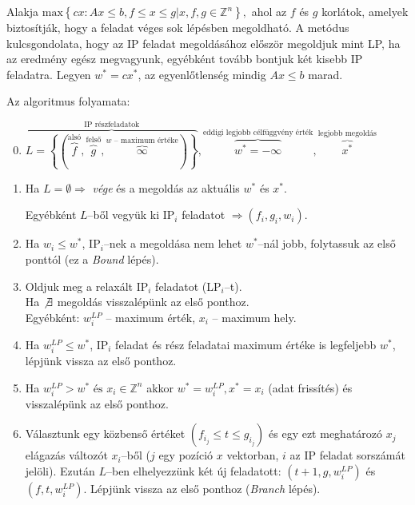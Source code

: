 Alakja $\mbox{max} \left\{cx:Ax \leq b, f \leq x \leq g| x,f,g \in \mathbb{Z}^n
	\right\},$ ahol az $f$ és $g$ korlátok, amelyek biztosítják, hogy a feladat véges sok
lépésben megoldható. A metódus kulcsgondolata, hogy az IP feladat megoldásához először
megoldjuk mint LP, ha az eredmény egész megvagyunk, egyébként tovább bontjuk két kisebb
IP feladatra. Legyen $w^*=cx^*$, az egyenlőtlenség mindig $Ax \leq b$ marad.

Az algoritmus folyamata:

\begin{enumerate}
	\setcounter{enumi}{-1}
	\item $\overbrace{L=\left\{ \left(
			      \overbrace{f}^{\text{alsó}},\overbrace{g}^{\text{felső}},\overbrace{\infty}^{w
				      \text{ -- maximum értéke}} \right) \right\}}^{\text{IP részfeladatok}},
		      \overbrace{w^*=-\infty}^{\text{eddigi legjobb célfüggvény érték}},
		      \overbrace{x^*}^{\text{legjobb megoldás}}$
	\item Ha $L=\emptyset \Rightarrow$ \emph{vége} és a megoldás az aktuális $w^*$
	      és $x^*$.

	      Egyébként $L$--ből vegyük ki IP$_i$ feladatot $\Rightarrow (f_i, g_i, w_i)$.
	\item Ha $w_i \leq w^*$, IP$_i$--nek a megoldása nem lehet $w^*$--nál jobb,
	      folytassuk az első ponttól (ez a \emph{Bound} lépés).
	\item Oldjuk meg a relaxált IP$_i$ feladatot (LP$_i$--t).
	      \\ Ha $\not \exists$ megoldás visszalépünk az első ponthoz.
	      \\ Egyébként: $w^{LP}_{i}$ -- maximum érték,  $x_i$ -- maximum hely.
	\item Ha $w^{LP}_{i} \leq w^*$, IP$_i$ feladat és rész feladatai maximum értéke is
	      legfeljebb $w^*$, lépjünk vissza az első ponthoz.
	\item Ha $w^{LP}_{i} > w^* \mbox{ és } x_i \in \mathbb{Z}^{n}$ akkor $ w^* = w^{LP}_{i}, x^* =
		      x_i$ (adat frissítés) és visszalépünk az első ponthoz.
	\item Választunk egy közbenső értéket $(f_{i_j} \leq t \leq g_{i_j})$ és egy
	      ezt meghatározó $x_j$ elágazás változót $x_i$--ből ($j$ egy pozíció $x$
	      vektorban, $i$ az IP feladat sorszámát jelöli). Ezután $L$--ben elhelyezzünk
	      két új feladatott:  $(t+1, g, w^{LP}_{i})$ és $(f, t, w^{LP}_{i})$. Lépjünk vissza az első
	      ponthoz (\emph{Branch} lépés).
\end{enumerate}

